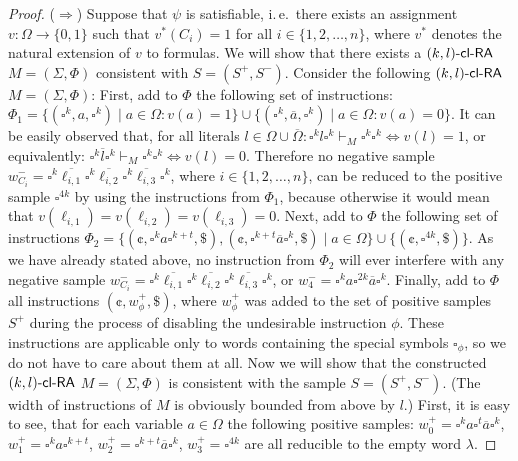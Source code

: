 \begin{proof}
($\Rightarrow$)
Suppose that $\psi$ is satisfiable, i.\,e.\ there exists an assignment
$v: \Omega \to \{0, 1\}$ such that $v^*(C_i) = 1$ for all $i \in \{1, 2, \ldots, n\}$,
where $v^*$ denotes the natural extension of $v$ to formulas.
We will show that there exists a $\textup{\sf $(k,l)$-\textup{\sf cl-RA\/}}$ $M = (\Sigma, \Phi)$ 
consistent with $S = (S^+, S^-)$.
Consider the following $\textup{\sf $(k,l)$-\textup{\sf cl-RA\/}}$ $M = (\Sigma, \Phi)$: First,  
add to $\Phi$ the following set of instructions: 
$\Phi_1 = \{ (\square^k, a, \square^k) \mid a \in \Omega: v(a) = 1 \} \cup
\{ (\square^k, \overline{a}, \square^k) \mid a \in \Omega: v(a) = 0 \}$.
It can be easily observed that, for all literals $l \in \Omega \cup \overline{\Omega}:
\square^k l \square^k \vdash_M \square^k \square^k \Leftrightarrow v(l) = 1$, 
or equivalently:
$\square^k \overline{l} \square^k \vdash_M \square^k \square^k \Leftrightarrow v(l) = 0$. 
Therefore no negative sample 
$w_{C_i}^- = \square^k \overline{\ell_{i,1}} \square^k \overline{\ell_{i,2}} 
\square^k \overline{\ell_{i,3}} \square^k$,
where $i \in \{1, 2, \ldots, n\}$, can be reduced to the positive sample 
$\square^{4k}$ by using the instructions from $\Phi_1$, because otherwise 
it would mean that $v(\ell_{i,1}) = v(\ell_{i,2}) = v(\ell_{i,3}) = 0$.
Next, add to $\Phi$ the following set of instructions 
$\Phi_2 = \{ (\cent, \square^k a \square^{k+t}, \$), 
(\cent, \square^{k+t} \overline{a} \square^k, \$)
\mid a \in \Omega \} \cup \{ (\cent, \square^{4k}, \$) \}$.
As we have already stated above, no instruction from $\Phi_2$ will ever interfere
with any negative sample 
$w_{C_i}^- = \square^k \overline{\ell_{i,1}} \square^k \overline{\ell_{i,2}} 
\square^k \overline{\ell_{i,3}} \square^k$, or 
$w_4^- = \square^k a \square^{2k}  \overline{a} \square^k$.
Finally, add to $\Phi$ all instructions $(\cent,  w_{\phi}^+, \$)$, 
where $ w_{\phi}^+$ was added to the set of positive samples $S^+$ 
during the process of disabling the undesirable instruction $\phi$.
These instructions are applicable only to words containing the special
symbols $\square_{\phi}$, so we do not have to care about them at all.
Now we will show that the constructed $\textup{\sf $(k,l)$-\textup{\sf cl-RA\/}}$ $M = (\Sigma, \Phi)$ 
is consistent with the sample $S = (S^+, S^-)$.
(The width of instructions of $M$ is obviously bounded from above by $l$.)
First, it is easy to see, that for each variable $a \in \Omega$ the following
positive samples:
$w_0^+ = \square^k a \square^t \overline{a} \square^k$, 
$w_1^+ = \square^k a \square^{k+t}$, 
$w_2^+ = \square^{k+t} \overline{a} \square^k$,
$w_3^+ = \square^{4k}$
are all reducible to the empty word $\lambda$.

\end{proof}

